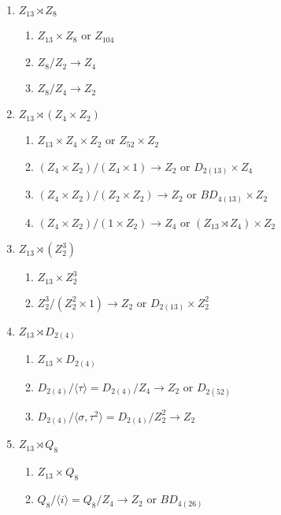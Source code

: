\documentclass[12pt]{article}
\theoremstyle{definition}
\newcommand{\<}{\langle}
\renewcommand{\>}{\rangle}
\begin{document}
\begin{enumerate}
    \item $Z_{13} \rtimes Z_8$
    \begin{enumerate}
        \item $Z_{13} \times Z_8$ or $Z_{104}$
        \item $Z_8/Z_2 \to Z_4$
        \item $Z_8/Z_4 \to Z_2$
    \end{enumerate}
    \item $Z_{13} \rtimes (Z_4 \times Z_2)$
    \begin{enumerate}
        \item $Z_{13} \times Z_4 \times Z_2$ or $Z_{52} \times Z_2$
        \item $(Z_4 \times Z_2)/(Z_4 \times 1) \to Z_2$ or $D_{2(13)} \times Z_4$
        \item $(Z_4 \times Z_2)/(Z_2 \times Z_2) \to Z_2$ or $BD_{4(13)} \times Z_2$
        \item $(Z_4 \times Z_2)/(1 \times Z_2) \to Z_4$ or $(Z_{13} \rtimes Z_4) \times Z_2$
    \end{enumerate}
    \item $Z_{13} \rtimes (Z_2^3)$
    \begin{enumerate}
        \item $Z_{13} \times Z_2^3$
        \item $Z_2^3/(Z_2^2 \times 1) \to Z_2$ or $D_{2(13)} \times Z_2^2$
    \end{enumerate}
    \item $Z_{13} \rtimes D_{2(4)}$
    \begin{enumerate}
        \item $Z_{13} \times D_{2(4)}$
        \item $D_{2(4)}/\<\tau\> = D_{2(4)}/Z_4 \to Z_2$ or $D_{2(52)}$
        \item $D_{2(4)}/\<\sigma, \tau^2\> = D_{2(4)}/Z_2^2 \to Z_2$
    \end{enumerate}
    \item $Z_{13} \rtimes Q_8$
    \begin{enumerate}
        \item $Z_{13} \times Q_8$
        \item $Q_8/\<i\> = Q_8/Z_4 \to Z_2$ or $BD_{4(26)}$
    \end{enumerate}
\end{enumerate}
\end{document}
